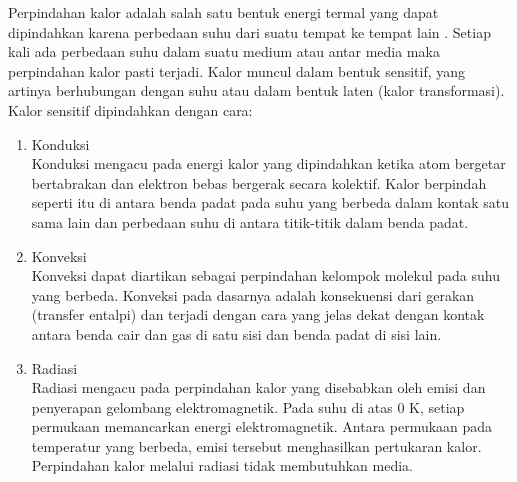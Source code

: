 
Perpindahan kalor adalah salah satu bentuk energi termal yang dapat dipindahkan karena perbedaan suhu dari suatu tempat ke tempat lain \cite{HeatTransferIncropera}. Setiap kali ada perbedaan suhu dalam suatu medium atau antar media maka perpindahan kalor pasti terjadi. Kalor muncul dalam bentuk sensitif, yang artinya berhubungan dengan suhu atau dalam bentuk laten (kalor transformasi). Kalor sensitif dipindahkan dengan cara: \cite{BuildingPhysics}

\begin{enumerate}
	\item Konduksi \\
	Konduksi mengacu pada energi kalor yang dipindahkan ketika atom bergetar bertabrakan dan elektron bebas bergerak secara kolektif. Kalor berpindah seperti itu di antara benda padat pada suhu yang berbeda dalam kontak satu sama lain dan perbedaan suhu di antara titik-titik dalam benda padat.
	\item Konveksi \\
	Konveksi dapat diartikan sebagai perpindahan kelompok molekul pada suhu yang berbeda. Konveksi pada dasarnya adalah konsekuensi dari gerakan (transfer entalpi) dan terjadi dengan cara yang jelas dekat dengan kontak antara benda cair dan gas di satu sisi dan benda padat di sisi lain.
	\item Radiasi \\
	Radiasi mengacu pada perpindahan kalor yang disebabkan oleh emisi dan penyerapan gelombang elektromagnetik. Pada suhu di atas 0 K, setiap permukaan memancarkan energi elektromagnetik. Antara permukaan pada temperatur yang berbeda, emisi tersebut menghasilkan pertukaran kalor. Perpindahan kalor melalui radiasi tidak membutuhkan media.
\end{enumerate}

